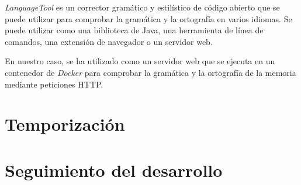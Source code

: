 \textit{LanguageTool} es un corrector gramático y estilístico de código abierto que se puede utilizar para comprobar la gramática y la ortografía en varios idiomas. Se puede utilizar como una biblioteca de Java, una herramienta de línea de comandos, una extensión de navegador o un servidor web.

En nuestro caso, se ha utilizado como un servidor web que se ejecuta en un contenedor de \textit{Docker} para comprobar la gramática y la ortografía de la memoria mediante peticiones HTTP.

\section{Temporización}

\section{Seguimiento del desarrollo}

